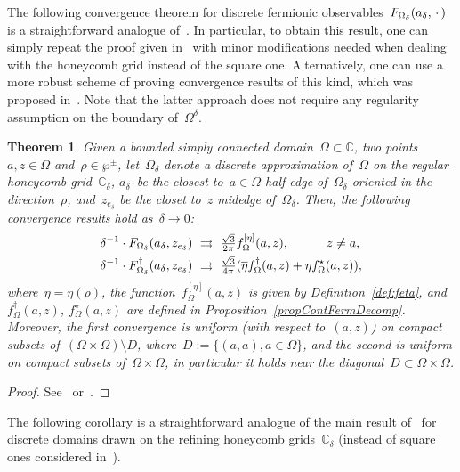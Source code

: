 \documentclass[reqno,11pt,a4paper]{amsart}
\newtheorem{theorem}{Theorem}
\theoremstyle{remark}
\newcommand{\C}{\mathbb{C}}
\newcommand{\feta}{f_{\Omega}^{[\eta]}}
\newcommand{\fstar}{f_{\Omega}^\star}
\newcommand{\freg}{f_{\Omega}^\dag}
\begin{document}
The following convergence theorem for discrete fermionic observables~$F_{\Omega_\delta}(a_\delta,\,\cdot\,)$ is a straightforward analogue of~\cite[Theorem~1.8]{HonSmi13}. In particular, to obtain this result, one can simply repeat the proof given in~\cite{HonSmi13} with minor modifications needed when dealing with the honeycomb grid instead of the square one. Alternatively, one can use a more robust scheme of proving convergence results of this kind, which was proposed in~\cite[Section~3.4]{CheHonIzy15}. Note that the latter approach does not require any regularity assumption on the boundary of~$\Omega^\delta$.

\begin{theorem}
\label{thm:convergence-fermions}
Given a bounded simply connected domain~$\Omega\subset\C$, two points~$a,z\in\Omega$ and~$\rho\in\wp^\pm$, let~$\Omega_\delta$ denote a discrete approximation of~$\Omega$ on the regular honeycomb grid~$\C_\delta$, $a_\delta$~be the closest to~$a\in\Omega$ half-edge of~$\Omega_\delta$ oriented in the direction~$\rho$, and~$z_{e_\delta}$ be the closet to~$z$ midedge of~$\Omega_\delta$. Then, the following convergence results hold as~$\delta\to 0$:
\begin{align*}
\delta^{-1}\cdot\Fdelta(a_\delta,z_{e_\delta})&\ \rightrightarrows\ \tfrac{\sqrt{3}}{2\pi}\feta(a,z),\qquad \quad z\ne a, \\
\delta^{-1}\cdot\Fdelta^\dag(a_\delta,z_{e_\delta})&\ \rightrightarrows\ {\tfrac{\sqrt{3}}{4\pi}}(\overline{\eta}\freg(a,z)+\eta\fstar(a,z)),
\end{align*}
where~$\eta=\eta(\rho)$, the function~$\feta(a,z)$ is given by Definition~\ref{def:feta}, and~$\freg(a,z)$, $\fstar(a,z)$ are defined in Proposition~\ref{propContFermDecomp}. Moreover, the first convergence is uniform (with respect to~$(a,z)$) on compact subsets of~$(\Omega\times\Omega)\setminus D$, where~$D:=\{(a,a),a\in\Omega\}$, and the second is uniform on compact subsets of~$\Omega\times\Omega$, in particular it holds near the diagonal~$D\subset\Omega\times\Omega$.
\end{theorem}

\begin{proof}
	See~\cite[Theorem~1.8]{HonSmi13} or~\cite{CheHonIzy21}.
\end{proof}

The following corollary is a straightforward analogue of the main result of~\cite{HonSmi13} for discrete domains drawn on the refining honeycomb grids~$\C_\delta$ (instead of square ones considered in~\cite{HonSmi13}).
\end{document}
